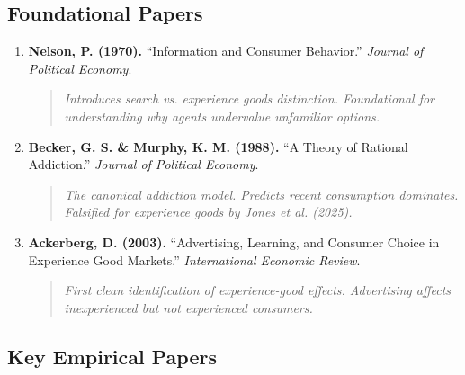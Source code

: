 \documentclass[11pt, a4paper]{article}
\begin{document}
\subsection{Foundational Papers}

\begin{enumerate}

\item \textbf{Nelson, P. (1970).} ``Information and Consumer Behavior.'' \textit{Journal of Political Economy}.
\begin{quote}
\textit{Introduces search vs. experience goods distinction. Foundational for understanding why agents undervalue unfamiliar options.}
\end{quote}

\item \textbf{Becker, G. S. \& Murphy, K. M. (1988).} ``A Theory of Rational Addiction.'' \textit{Journal of Political Economy}.
\begin{quote}
\textit{The canonical addiction model. Predicts recent consumption dominates. Falsified for experience goods by Jones et al. (2025).}
\end{quote}

\item \textbf{Ackerberg, D. (2003).} ``Advertising, Learning, and Consumer Choice in Experience Good Markets.'' \textit{International Economic Review}.
\begin{quote}
\textit{First clean identification of experience-good effects. Advertising affects inexperienced but not experienced consumers.}
\end{quote}

\end{enumerate}

\subsection{Key Empirical Papers}
\end{document}
